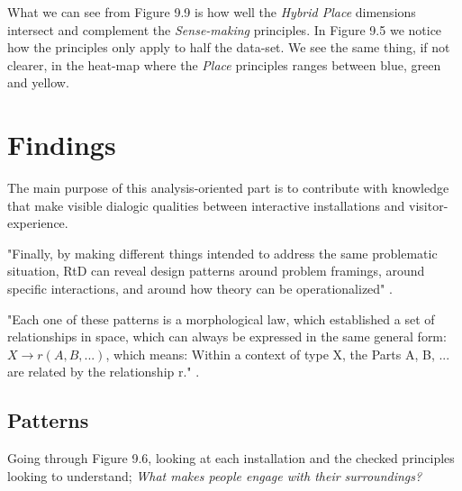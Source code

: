 What we can see from Figure 9.9 is how well the \textit{Hybrid Place} dimensions intersect and complement the \textit{Sense-making} principles. In Figure 9.5 we notice how the principles only apply to half the data-set. We see the same thing, if not clearer, in the heat-map where the \textit{Place} principles ranges between blue, green and yellow.

\section{Findings}

The main purpose of this analysis-oriented part is to contribute with knowledge that make visible dialogic qualities between interactive installations and visitor-experience.

"Finally, by making different things intended to address the same problematic situation, RtD can reveal design patterns \autocite{Alexander_book} around problem framings, around specific interactions, and around how theory can be operationalized" \autocite[p. 178]{zimmerman_research_2014}.


"Each one of these patterns is a morphological law, which established a set of relationships in space, which can always be expressed in the same general form: $X \rightarrow r (A, B, ...)$, which means: Within a context of type X, the Parts A, B, ... are related by the relationship r." \autocite[p. 90]{Alexander_book}.


\subsection{Patterns}
Going through Figure 9.6, looking at each installation and the checked principles looking to understand; \textit{What makes people engage with their surroundings?} 


